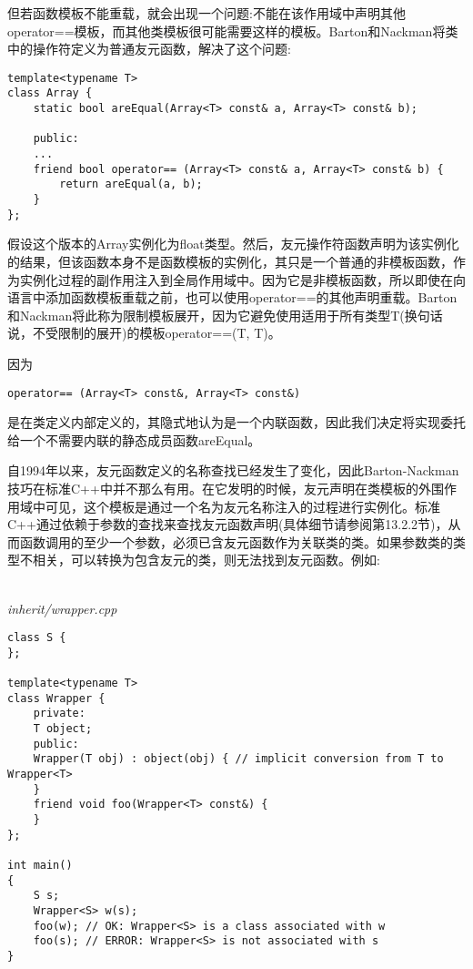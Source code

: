 但若函数模板不能重载，就会出现一个问题:不能在该作用域中声明其他operator==模板，而其他类模板很可能需要这样的模板。Barton和Nackman将类中的操作符定义为普通友元函数，解决了这个问题:

\begin{lstlisting}[style=styleCXX]
template<typename T>
class Array {
	static bool areEqual(Array<T> const& a, Array<T> const& b);
	
	public:
	...
	friend bool operator== (Array<T> const& a, Array<T> const& b) {
		return areEqual(a, b);
	}
};
\end{lstlisting}

假设这个版本的Array实例化为float类型。然后，友元操作符函数声明为该实例化的结果，但该函数本身不是函数模板的实例化，其只是一个普通的非模板函数，作为实例化过程的副作用注入到全局作用域中。因为它是非模板函数，所以即使在向语言中添加函数模板重载之前，也可以使用operator==的其他声明重载。Barton和Nackman将此称为限制模板展开，因为它避免使用适用于所有类型T(换句话说，不受限制的展开)的模板operator==(T, T)。

因为

\begin{lstlisting}[style=styleCXX]
operator== (Array<T> const&, Array<T> const&)
\end{lstlisting}

是在类定义内部定义的，其隐式地认为是一个内联函数，因此我们决定将实现委托给一个不需要内联的静态成员函数areEqual。

自1994年以来，友元函数定义的名称查找已经发生了变化，因此Barton-Nackman技巧在标准C++中并不那么有用。在它发明的时候，友元声明在类模板的外围作用域中可见，这个模板是通过一个名为友元名称注入的过程进行实例化。标准C++通过依赖于参数的查找来查找友元函数声明(具体细节请参阅第13.2.2节)，从而函数调用的至少一个参数，必须已含友元函数作为关联类的类。如果参数类的类型不相关，可以转换为包含友元的类，则无法找到友元函数。例如:

\hspace*{\fill} \\ %
\noindent
\textit{inherit/wrapper.cpp}
\begin{lstlisting}[style=styleCXX]
class S {
};

template<typename T>
class Wrapper {
	private:
	T object;
	public:
	Wrapper(T obj) : object(obj) { // implicit conversion from T to Wrapper<T>
	}
	friend void foo(Wrapper<T> const&) {
	}
};

int main()
{
	S s;
	Wrapper<S> w(s);
	foo(w); // OK: Wrapper<S> is a class associated with w
	foo(s); // ERROR: Wrapper<S> is not associated with s
}
\end{lstlisting}

